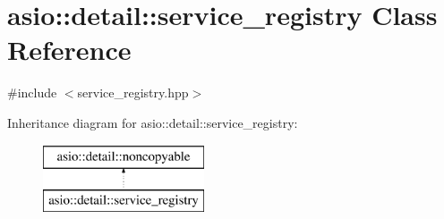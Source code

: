 \hypertarget{classasio_1_1detail_1_1service__registry}{}\section{asio\+:\+:detail\+:\+:service\+\_\+registry Class Reference}
\label{classasio_1_1detail_1_1service__registry}


{\ttfamily \#include $<$service\+\_\+registry.\+hpp$>$}

Inheritance diagram for asio\+:\+:detail\+:\+:service\+\_\+registry\+:\begin{figure}[H]
\begin{center}
\leavevmode
\includegraphics[height=2.000000cm]{classasio_1_1detail_1_1service__registry}
\end{center}
\end{figure}
